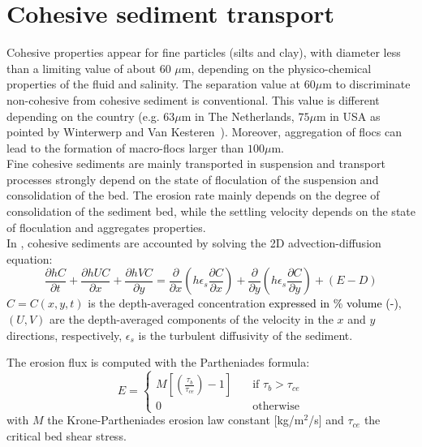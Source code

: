\section{Cohesive sediment transport}
Cohesive properties appear for fine particles (silts and clay), with diameter less than a limiting value of about 60 $\mu$m, depending on the physico-chemical
properties of the fluid and salinity. The separation value at $60\mu$m to discriminate non-cohesive from cohesive sediment is conventional. This value is different depending on the country (e.g. $63\mu$m in The Netherlands, $75\mu$m in USA as pointed by Winterwerp and Van Kesteren~\cite{Winterwerp}). Moreover, aggregation of flocs can lead to the formation of macro-flocs larger than $100\mu$m.\\

Fine cohesive sediments are mainly transported in suspension and transport processes strongly depend on the state of floculation of the suspension and consolidation of the bed. The erosion rate mainly depends on the degree of consolidation of the sediment bed, while the settling velocity depends on the state of floculation and aggregates properties.\\

In \gaia{}, cohesive sediments are accounted by solving the 2D advection-diffusion equation:
\begin{equation*}
\frac{\partial hC}{\partial t} + \frac{\partial hUC}{\partial x} + \frac{\partial hVC}{\partial y} =
\frac{\partial}{\partial x}\left(h\epsilon_s\frac{\partial C}{\partial x}\right) +
\frac{\partial}{\partial y}\left(h\epsilon_s\frac{\partial C}{\partial y}\right) + (E-D)
\end{equation*}
$C=C(x,y,t)$ is the depth-averaged concentration \textcolor{black}{expressed in \% volume (-)}, $(U,V)$ are the depth-averaged components of the velocity in the $x$ and $y$ directions, respectively, $\epsilon_s$ is the turbulent diffusivity of the sediment.

The erosion flux is computed with the Partheniades formula:
\begin{equation*}
E = \left\{\begin{array}{ll}
M\left[\left(\frac{\tau_b}{\tau_{ce}}\right)-1\right]\quad & \text{if}\,\,\tau_b> \tau_{ce}\\
0\quad & \text{otherwise}
\end{array}
\right.
\end{equation*}
with $M$ the Krone-Partheniades erosion law constant [kg/m$^2$/s] and $\tau_{ce}$ the critical bed shear stress.

